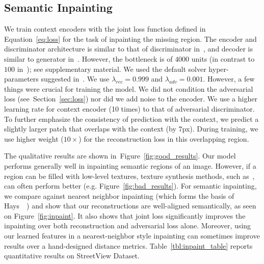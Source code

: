\documentclass[10pt,twocolumn,letterpaper]{article}
\newcommand{\reffig}[1]{Figure~\ref{fig:#1}}
\newcommand{\refsec}[1]{Section~\ref{sec:#1}}
\newcommand{\reftbl}[1]{Table~\ref{tbl:#1}}
\newcommand{\lblsec}[1]{\label{sec:#1}}
\newcommand{\lbltbl}[1]{\label{tbl:#1}}
\begin{document}
\begin{table}[t]
\centering
{}
\vspace{-0.5em}
\caption{\small Semantic Inpainting accuracy for Paris StreetView dataset on \textit{held-out} images. NN inpainting is basis for~\cite{hays2007scene}.}
\lbltbl{inpaint_table}
\vspace{-0.5em}
\end{table}

\subsection{Semantic Inpainting}
\lblsec{inpaint}
We train context encoders with the joint loss function defined in Equation~\eqref{eq:loss} for the task of inpainting the missing region.
The encoder and discriminator architecture is similar to that of discriminator in~\cite{dcgan}, and decoder is similar to generator in~\cite{dcgan}.
However, the bottleneck is of $4000$ units (in contrast to $100$ in~\cite{dcgan}); see supplementary material.
We used the default solver hyper-parameters suggested in~\cite{dcgan}.
We use $\lambda_{rec}=0.999$ and $\lambda_{adv}=0.001$.
However, a few things were crucial for training the model. We did not condition the adversarial loss (see~\refsec{loss}) nor did we add noise to the encoder. We use a higher learning rate for context encoder (10 times) to that of adversarial discriminator.
To further emphasize the consistency of prediction with the context, we predict a slightly larger patch that overlaps with the context (by 7px). During training, we use higher weight ($10\times$) for the reconstruction loss in this overlapping region.

The qualitative results are shown in~\reffig{good_results}.
Our model performs generally well in inpainting semantic regions of an image.
However, if a region can be filled with low-level textures, texture synthesis methods, such as~\cite{efros1999texture,barnes2009patchmatch}, can often perform better (e.g. \reffig{bad_results}).
For semantic inpainting, we compare against nearest neighbor inpainting (which forms the basis of Hays~\etal~\cite{hays2007scene}) and show that our reconstructions are well-aligned semantically, as seen on \reffig{inpaint}.
It also shows that joint loss significantly improves the inpainting over both reconstruction and adversarial loss alone.
Moreover, using our learned features in a nearest-neighbor style inpainting can sometimes improve results over a hand-designed distance metrics.
\reftbl{inpaint_table} reports quantitative results on StreetView Dataset.
\end{document}
